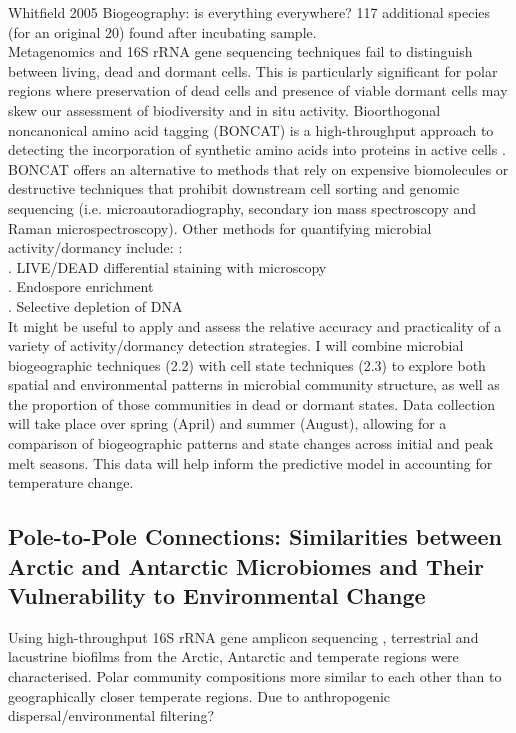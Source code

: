\noindent Whitfield 2005 Biogeography:  is  everything  everywhere? 117 additional species (for an original 20) found after incubating sample.\\

\noindent Metagenomics and 16S rRNA gene sequencing techniques fail to distinguish between living, dead and dormant cells. This is particularly significant for polar regions where preservation of dead cells and presence of viable dormant cells may skew our assessment of biodiversity and in situ activity. Bioorthogonal noncanonical amino acid tagging (BONCAT) is a high-throughput approach to detecting the incorporation of synthetic amino acids into proteins in active cells \cite{hatzenpichler2016visualizing}. BONCAT offers an alternative to methods that rely on expensive biomolecules or destructive techniques that prohibit downstream cell sorting and genomic sequencing (i.e. microautoradiography, secondary ion mass spectroscopy and Raman microspectroscopy). Other methods for quantifying microbial activity/dormancy include: \cite{burkert2019changes}:\\

. LIVE/DEAD differential staining with microscopy\\
. Endospore enrichment\\
. Selective depletion of DNA\\

\noindent It might be useful to apply and assess the relative accuracy and practicality of a variety of activity/dormancy detection strategies. I will combine microbial biogeographic techniques (2.2) with cell state techniques (2.3) to explore both spatial and environmental patterns in microbial community structure, as well as the proportion of those communities in dead or dormant states. Data collection will take place over spring (April) and summer (August), allowing for a comparison of biogeographic patterns and state changes across initial and peak melt seasons. This data will help inform the predictive model in accounting for temperature change.

\subsection{Pole-to-Pole Connections: Similarities between Arctic and Antarctic Microbiomes and Their Vulnerability to Environmental Change \cite{kleinteich2017pole}} 

\noindent Using high-throughput 16S rRNA gene amplicon sequencing , terrestrial and lacustrine biofilms from the Arctic, Antarctic and temperate regions were characterised. Polar community compositions more similar to each other than to geographically closer temperate regions. Due to anthropogenic dispersal/environmental filtering?  \\

